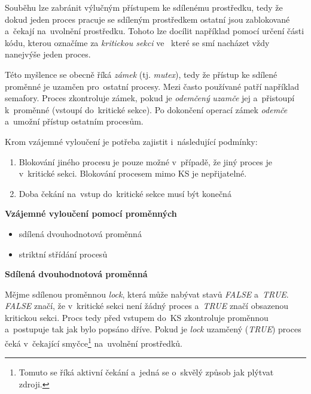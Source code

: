 Souběhu lze zabránit výlučným přístupem ke sdílenému prostředku, tedy že dokud jeden proces pracuje se sdíleným prostředkem ostatní jsou zablokované a~čekají na~uvolnění prostředku. Tohoto lze docílit například pomocí určení části kódu, kterou označíme za \emph{kritickou sekci} ve~ které se smí nacházet vždy nanejvýše jeden proces. 

\vspace{0,5cm}

Této myšlence se obecně říká \emph{zámek} (tj. \emph{mutex}), tedy že přístup ke sdílené proměnné je uzamčen pro~ostatní procesy. Mezi často používané patří například semafory. Proces zkontroluje zámek, pokud je \emph{odemčený} \emph{uzamče} jej a~přistoupí k~proměnné (vstoupí do~kritické sekce). Po dokončení operací zámek \emph{odemče} a~umožní přístup ostatním procesům. 

\vspace{0,5cm}

Krom vzájemné vyloučení je potřeba zajistit i~následující podmínky:
\begin{enumerate}
    \item Blokování jiného procesu je pouze možné v~případě, že jiný proces je v~kritické sekci. Blokování procesem mimo KS je nepřijatelné. 
    \item Doba čekání na~vstup do~kritické sekce musí být konečná
\end{enumerate}

\begin{large}
    \vspace{0,5cm}
    \textbf{Vzájemné vyloučení pomocí proměnných}
\end{large}

\begin{itemize}
    \item sdílená dvouhodnotová proměnná
    \item striktní střídání procesů
\end{itemize}

\begin{large}
    \vspace{0,5cm}
    \textbf{Sdílená dvouhodnotová proměnná}
\end{large}

Mějme sdílenou proměnnou \emph{lock}, která může nabývat stavů \emph{FALSE} a~\emph{TRUE}. \emph{FALSE} značí, že v~kritické sekci není žádný proces a~\emph{TRUE} značí obsazenou kritickou sekci. Procs tedy před vstupem do~KS zkontroluje proměnnou a~postupuje tak jak bylo popsáno dříve. Pokud je \emph{lock} uzamčený (\emph{TRUE}) proces čeká v~čekající smyčce\footnote{Tomuto se říká aktivní čekání a~jedná se o~skvělý způsob jak plýtvat zdroji.} na~uvolnění prostředků. 

